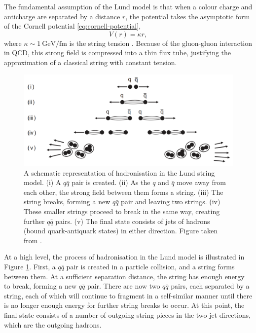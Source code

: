 \documentclass[12pt,a4paper]{report}
\begin{document}
The fundamental assumption of the Lund model is that when a colour charge and anticharge are separated by a distance $r$, the potential takes the asymptotic form of the Cornell potential \eqref{eq:cornell-potential},
\begin{equation}
  V(r) = \kappa r,
\end{equation}
where $\kappa \sim \qty{1}{\giga\electronvolt\per\femto\meter}$ is the string tension \cite{Bali:1992ab}. Because of the gluon-gluon interaction in QCD, this strong field is compressed into a thin flux tube, justifying the approximation of a classical string with constant tension.

\begin{figure}
  \centering
  \includegraphics[width=0.8\linewidth]{figures/lund-hadronisation.png}
  \caption{A schematic representation of hadronisation in the Lund string model. (i) A $q\bar{q}$ pair is created. (ii) As the $q$ and $\bar{q}$ move away from each other, the strong field between them forms a string. (iii) The string breaks, forming a new $q\bar{q}$ pair and leaving two strings. (iv) These smaller strings proceed to break in the same way, creating further $q\bar{q}$ pairs. (v) The final state consists of jets of hadrons (bound quark-antiquark states) in either direction. Figure taken from \cite{Thomson:2013zua}.}
  \label{fig:lund-hadronisation}
\end{figure}

At a high level, the process of hadronisation in the Lund model is illustrated in Figure \ref{fig:lund-hadronisation}. First, a $q\bar{q}$ pair is created in a particle collision, and a string forms between them. At a sufficient separation distance, the string has enough energy to break, forming a new $q\bar{q}$ pair. There are now two $q\bar{q}$ pairs, each separated by a string, each of which will continue to fragment in a self-similar manner until there is no longer enough energy for further string breaks to occur. At this point, the final state consists of a number of outgoing string pieces in the two jet directions, which are the outgoing hadrons.
\end{document}
